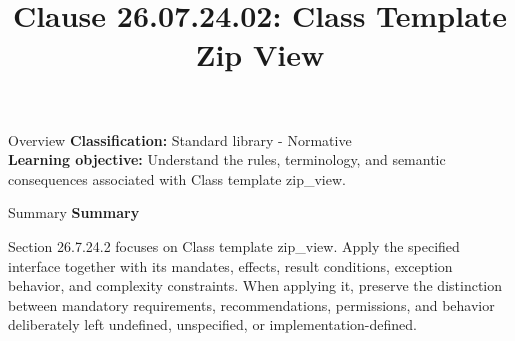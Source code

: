 \documentclass[10pt,letterpaper]{article}
\title{Clause 26.07.24.02: Class Template Zip View}
\author{}
\date{}
\begin{document}
\maketitle
\begin{CornellOverviewBox}{Overview}
\textbf{Classification:} Standard library - Normative\\[2pt]
\textbf{Learning objective:} Understand the rules, terminology, and semantic consequences associated with Class template zip\_view.
\end{CornellOverviewBox}\begin{CornellSummaryBox}{Summary}
{\sffamily\bfseries\color{Accent} Summary}\par\vspace{3pt}Section 26.7.24.2 focuses on Class template zip\_view. Apply the specified interface together with its mandates, effects, result conditions, exception behavior, and complexity constraints. When applying it, preserve the distinction between mandatory requirements, recommendations, permissions, and behavior deliberately left undefined, unspecified, or implementation-defined.
\end{CornellSummaryBox}
\end{document}
